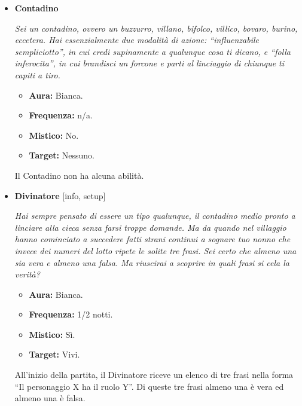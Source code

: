 \documentclass[a4paper,10pt]{article}
\begin{document}
\begin{itemize}
      \item \textbf{Contadino}

            \emph{Sei un contadino, ovvero un buzzurro, villano, bifolco, villico, bovaro, burino, eccetera. Hai essenzialmente due modalità di azione: ``influenzabile sempliciotto'', in cui credi supinamente a qualunque cosa ti dicano, e ``folla inferocita'', in cui brandisci un forcone e parti al linciaggio di chiunque ti capiti a tiro.}

            \begin{multicols}{2}
                  \begin{itemize}
                        \item \textbf{Aura:} Bianca.
                        \item \textbf{Frequenza:} n/a.
                        \item \textbf{Mistico:} No.
                        \item \textbf{Target:} Nessuno.
                  \end{itemize}
            \end{multicols}

            Il Contadino non ha alcuna abilità.

      \item \textbf{Divinatore} [info, setup]

            \emph{Hai sempre pensato di essere un tipo qualunque, il contadino medio pronto a linciare alla cieca senza farsi troppe domande. Ma da quando nel villaggio hanno cominciato a succedere fatti strani continui a sognare tuo nonno che invece dei numeri del lotto ripete le solite tre frasi. Sei certo che almeno una sia vera e almeno una falsa. Ma riuscirai a scoprire in quali frasi si cela la verità?}

            \begin{multicols}{2}
                  \begin{itemize}
                        \item \textbf{Aura:} Bianca.
                        \item \textbf{Frequenza:} 1/2 notti.
                        \item \textbf{Mistico:} Sì.
                        \item \textbf{Target:} Vivi.
                  \end{itemize}
            \end{multicols}

            All'inizio della partita, il Divinatore riceve un elenco di tre frasi nella forma ``Il personaggio X ha il ruolo Y''. Di queste tre frasi almeno una è vera ed almeno una è falsa.


\end{itemize}
\end{document}
